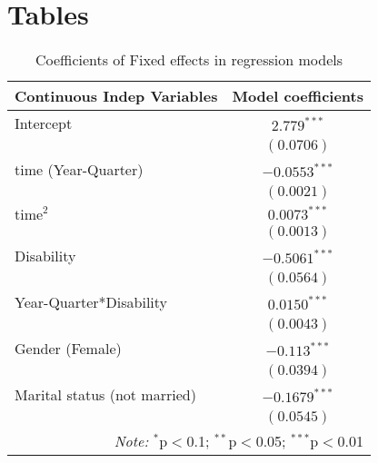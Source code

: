 
\section{Tables}

\noindent
\begin{table}[H] 
\centering 
\footnotesize
\caption{Coefficients of Fixed effects in regression models} 
\begin{tabular}{l|c}
\hline 
\hline 
%
Continuous Indep Variables & Model coefficients \\
\hline 
Intercept			&	$2.779^{***}$		\\
				&	$(0.0706)$		\\
time (Year-Quarter)		&	$-0.0553^{***}$		\\
				&	$(0.0021)$		\\
$\text{time}^2$			&	$0.0073^{***}$		\\
				&	$(0.0013)$		\\
Disability			&	$-0.5061^{***}$		\\    
				&	$(0.0564)$		\\
Year-Quarter*Disability		&	$0.0150^{***}$		\\
				&	$(0.0043)$		\\
Gender (Female)	 		&	$-0.113^{***}$		\\
				&	$(0.0394)$		\\
Marital status (not married) 	&	$-0.1679^{***}$		\\
				&	$(0.0545)$		\\
\hline 
\hline 
\multicolumn{2}{r}{\textit{Note:}  $^{*}$p$<$0.1; $^{**}$p$<$0.05; $^{***}$p$<$0.01} \\ 

\end{tabular}
\label{tab:FixedEffectsBetas} 
\end{table}


